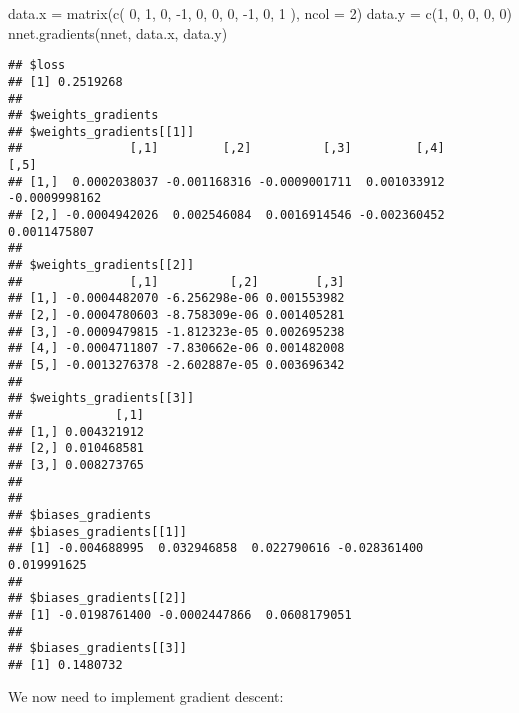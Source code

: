 \documentclass[
  a4paper,
]{article}
\newenvironment{Shaded}{\begin{snugshade}}{\end{snugshade}}
\newcommand{\AttributeTok}[1]{\textcolor[rgb]{0.77,0.63,0.00}{#1}}
\newcommand{\DecValTok}[1]{\textcolor[rgb]{0.00,0.00,0.81}{#1}}
\newcommand{\FunctionTok}[1]{\textcolor[rgb]{0.00,0.00,0.00}{#1}}
\newcommand{\NormalTok}[1]{#1}
\newcommand{\OtherTok}[1]{\textcolor[rgb]{0.56,0.35,0.01}{#1}}
\newcommand{\SpecialCharTok}[1]{\textcolor[rgb]{0.00,0.00,0.00}{#1}}
\begin{document}
\begin{Shaded}
\begin{Highlighting}[]
\NormalTok{data.x }\OtherTok{=} \FunctionTok{matrix}\NormalTok{(}\FunctionTok{c}\NormalTok{(}
  \DecValTok{0}\NormalTok{, }\DecValTok{1}\NormalTok{, }\DecValTok{0}\NormalTok{, }\SpecialCharTok{{-}}\DecValTok{1}\NormalTok{, }\DecValTok{0}\NormalTok{,}
  \DecValTok{0}\NormalTok{, }\DecValTok{0}\NormalTok{, }\SpecialCharTok{{-}}\DecValTok{1}\NormalTok{, }\DecValTok{0}\NormalTok{, }\DecValTok{1}
\NormalTok{), }\AttributeTok{ncol =} \DecValTok{2}\NormalTok{)}
\NormalTok{data.y }\OtherTok{=} \FunctionTok{c}\NormalTok{(}\DecValTok{1}\NormalTok{, }\DecValTok{0}\NormalTok{, }\DecValTok{0}\NormalTok{, }\DecValTok{0}\NormalTok{, }\DecValTok{0}\NormalTok{)}
\FunctionTok{nnet.gradients}\NormalTok{(nnet, data.x, data.y)}
\end{Highlighting}
\end{Shaded}

\begin{verbatim}
## $loss
## [1] 0.2519268
## 
## $weights_gradients
## $weights_gradients[[1]]
##               [,1]         [,2]          [,3]         [,4]          [,5]
## [1,]  0.0002038037 -0.001168316 -0.0009001711  0.001033912 -0.0009998162
## [2,] -0.0004942026  0.002546084  0.0016914546 -0.002360452  0.0011475807
## 
## $weights_gradients[[2]]
##               [,1]          [,2]        [,3]
## [1,] -0.0004482070 -6.256298e-06 0.001553982
## [2,] -0.0004780603 -8.758309e-06 0.001405281
## [3,] -0.0009479815 -1.812323e-05 0.002695238
## [4,] -0.0004711807 -7.830662e-06 0.001482008
## [5,] -0.0013276378 -2.602887e-05 0.003696342
## 
## $weights_gradients[[3]]
##             [,1]
## [1,] 0.004321912
## [2,] 0.010468581
## [3,] 0.008273765
## 
## 
## $biases_gradients
## $biases_gradients[[1]]
## [1] -0.004688995  0.032946858  0.022790616 -0.028361400  0.019991625
## 
## $biases_gradients[[2]]
## [1] -0.0198761400 -0.0002447866  0.0608179051
## 
## $biases_gradients[[3]]
## [1] 0.1480732
\end{verbatim}

We now need to implement gradient descent:
\end{document}
